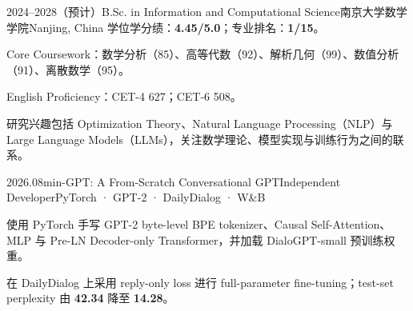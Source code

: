 \documentclass[11pt]{article}
\begin{document}
\makecvheader


\begin{cventry}{2024--2028（预计）}{B.Sc. in Information and Computational Science}{南京大学数学学院}{Nanjing, China}
学位学分绩：\textbf{4.45/5.0}；专业排名：\textbf{1/15}。
\begin{cvitems}
  \item Core Coursework：数学分析（85）、高等代数（92）、解析几何（99）、数值分析（91）、离散数学（95）。
  \item English Proficiency：CET-4 627；CET-6 508。
\end{cvitems}
\end{cventry}


研究兴趣包括 Optimization Theory、Natural Language Processing（NLP）与 Large Language Models（LLMs），关注数学理论、模型实现与训练行为之间的联系。


\begin{cvproject}{2026.08}{min-GPT: A From-Scratch Conversational GPT}{Independent Developer}{PyTorch · GPT-2 · DailyDialog · W\&B}
\begin{cvitems}
  \item 使用 PyTorch 手写 GPT-2 byte-level BPE tokenizer、Causal Self-Attention、MLP 与 Pre-LN Decoder-only Transformer，并加载 DialoGPT-small 预训练权重。
  \item 在 DailyDialog 上采用 reply-only loss 进行 full-parameter fine-tuning；test-set perplexity 由 \textbf{42.34} 降至 \textbf{14.28}。
\end{cvitems}
\end{cvproject}






\end{document}
